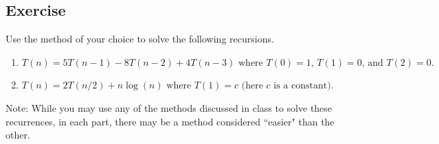\documentclass{article}
\newcounter{counter}
\newcommand{\Exercise}{Exercise \stepcounter{counter}\thecounter}
\begin{document}
\subsection*{\Exercise}
    Use the method of your choice to solve the following recursions.
    \begin{enumerate}
        \item $T(n) = 5T(n - 1) - 8T(n - 2) + 4T(n - 3) \text{ where $T(0) = 1$, $T(1) = 0$, and $T(2) = 0$}.$
        \item $T(n) = 2T(n/2) + n\log(n) \text{ where } T(1) = c \text{ (here $c$ is a constant)}.$
    \end{enumerate}
    {\small Note: While you may use any of the methods discussed in class to solve these recurrences, in each part, there may be a method considered ``easier" than the other.}
\end{document}
